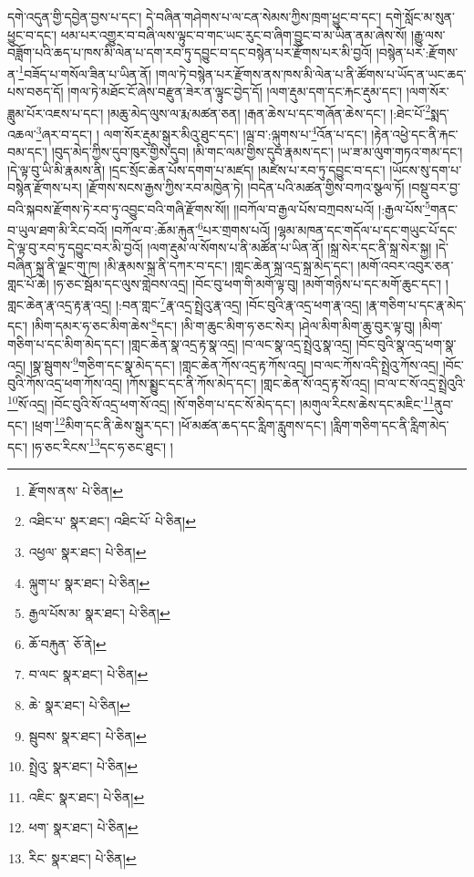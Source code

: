 དགེ་འདུན་གྱི་དབྱེན་བྱས་པ་དང་། དེ་བཞིན་གཤེགས་པ་ལ་ངན་སེམས་ཀྱིས་ཁྲག་ཕྱུང་བ་དང་། དགེ་སློང་མ་སུན་ཕྱུང་བ་དང་། ཕམ་པར་འགྱུར་བ་བཞི་ལས་ལྟུང་བ་གང་ཡང་རུང་བ་ཞིག་བྱུང་བ་མ་ཡིན་ནམ་ཞེས་སོ། །རྒྱུ་ལས་བཟློག་པའི་ཆད་པ་ཁས་མི་ལེན་པ་དག་རབ་ཏུ་དབྱུང་བ་དང་བསྙེན་པར་རྫོགས་པར་མི་བྱའོ། །བསྙེན་པར་:རྫོགས་ན་\footnote{རྫོགས་ནས་  པེ་ཅིན། }བཟོད་པ་གསོལ་ཟིན་པ་ཡིན་ནོ། །གལ་ཏེ་བསྙེན་པར་རྫོགས་ནས་ཁས་མི་ལེན་པ་ནི་ཚོགས་པ་ཡོད་ན་ཡང་ཆད་པས་བཅད་དོ། །གལ་ཏེ་མཐོང་ངོ་ཞེས་བརྫུན་ཟེར་ན་ལྟུང་བྱེད་དོ། །ལག་རྡུམ་དག་དང་རྐང་རྡུམ་དང་། །ལག་སོར་ཟླུམ་པོར་འཇས་པ་དང་། །མཆུ་མེད་ལུས་ལ་རྨ་མཚན་ཅན། །རྒན་ཆེས་པ་དང་གཞོན་ཆེས་དང་། །:ཐེང་པོ་\footnote{འཐིང་པ་  སྣར་ཐང་། འཐིང་པོ་  པེ་ཅིན། }སྨད་འཆལ་\footnote{འཕྱལ་  སྣར་ཐང་།  པེ་ཅིན། }ཞར་བ་དང་། །
ལག་སོར་རྡུམ་སྒུར་མིའུ་ཐུང་དང་། །ལྦ་བ་:ལྐུགས་པ་\footnote{ལྐུག་པ་  སྣར་ཐང་།  པེ་ཅིན། }འོན་པ་དང་། །རྟེན་འཕྱེ་དང་ནི་རྐང་བམ་དང་། །བུད་མེད་ཀྱིས་དུབ་ཁུར་གྱིས་དུབ། །མི་གང་ལམ་གྱིས་དུབ་རྣམས་དང་། །ཡ་ཟ་མ་ལུག་གཏའ་གམ་དང་། །དེ་ལྟ་བུ་ཡི་མི་རྣམས་ནི། །དྲང་སྲོང་ཆེན་པོས་དགག་པ་མཛད། །མཛེས་པ་རབ་ཏུ་དབྱུང་བ་དང་། །ཡོངས་སུ་དག་པ་བསྙེན་རྫོགས་པར། །རྫོགས་སངས་རྒྱས་ཀྱིས་རབ་མཁྱེན་ཏེ། །བདེན་པའི་མཚན་གྱིས་བཀའ་སྩལ་ཏོ། །བསྡུ་བར་བྱ་བའི་སྐབས་རྫོགས་ཏེ་རབ་ཏུ་འབྱུང་བའི་གཞི་རྫོགས་སོ།། །།བཀོལ་བ་རྒྱལ་པོས་བཀྲབས་པའོ། །:རྒྱལ་པོས་\footnote{རྒྱལ་པོས་མ་  སྣར་ཐང་།  པེ་ཅིན། }གནང་བ་ཡུལ་ཐག་མི་རིང་བའོ། །བཀོལ་བ་:ཆོམ་རྐུན་\footnote{ཆོ་བརྐུན་  ཅོ་ནེ། }པར་གྲགས་པའོ། །ལྷམ་མཁན་དང་གདོལ་པ་དང་གཡུང་པོ་དང་དེ་ལྟ་བུ་རབ་ཏུ་དབྱུང་བར་མི་བྱའོ། །ལག་རྡུམ་ལ་སོགས་པ་ནི་མཚོན་པ་ཡིན་ནོ། །སྐྲ་སེར་དང་ནི་སྐྲ་སེར་སྐྱ། །དེ་བཞིན་སྐྲ་ནི་ལྗང་གུ་ཁ། །མི་རྣམས་སྐྲ་ནི་དཀར་བ་དང་། །གླང་ཆེན་སྐྲ་འདྲ་སྐྲ་མེད་དང་། །མགོ་འབར་འབུར་ཅན་གླང་པོ་ཆེ། །ཧ་ཅང་སྦོམ་དང་ལུས་གླེབས་འདྲ། །བོང་བུ་ཕག་གི་མགོ་ལྟ་བུ། །མགོ་གཉིས་པ་དང་མགོ་ཆུང་དང་། །གླང་ཆེན་རྣ་འདྲ་རྟ་རྣ་འདྲ། །:བན་གླང་\footnote{བ་ལང་  སྣར་ཐང་།  པེ་ཅིན། }རྣ་འདྲ་སྤྲེའུ་རྣ་འདྲ། །བོང་བུའི་རྣ་འདྲ་ཕག་རྣ་འདྲ། །རྣ་གཅིག་པ་དང་རྣ་མེད་དང་། །མིག་དམར་ཧ་ཅང་མིག་ཆེས་\footnote{ཆེ་  སྣར་ཐང་།  པེ་ཅིན། }དང་། །མི་ག་ཆུང་མིག་ཧ་ཅང་སེར། །ཤེལ་མིག་མིག་ཆུ་བུར་ལྟ་བུ། །མིག་གཅིག་པ་དང་མིག་མེད་དང་། །གླང་ཆེན་སྣ་འདྲ་རྟ་སྣ་འདྲ། །བ་ལང་སྣ་འདྲ་སྤྲེའུ་སྣ་འདྲ། །བོང་བུའི་སྣ་འདྲ་ཕག་སྣ་འདྲ། །སྣ་སྦུགས་\footnote{སྦུབས་  སྣར་ཐང་།  པེ་ཅིན། }གཅིག་དང་སྣ་མེད་དང་། །གླང་ཆེན་ཀོས་འདྲ་རྟ་ཀོས་འདྲ། །བ་ལང་ཀོས་འདི་སྤྲེའུ་ཀོས་འདྲ། །བོང་བུའི་ཀོས་འདྲ་ཕག་ཀོས་འདྲ། །ཀོས་སྨྱུང་དང་ནི་ཀོས་མེད་དང་། །གླང་ཆེན་སོ་འདྲ་རྟ་སོ་འདྲ། །བ་ལ་ང་སོ་འདྲ་སྤྲེའུའི་\footnote{སྤྲེའུ་  སྣར་ཐང་།  པེ་ཅིན། }སོ་འདྲ། །བོང་བུའི་སོ་འདྲ་ཕག་སོ་འདྲ། །སོ་གཅིག་པ་དང་སོ་མེད་དང་། །མགུལ་རིངས་ཆེས་དང་མཇིང་\footnote{འཇིང་  སྣར་ཐང་།  པེ་ཅིན། }ནུབ་དང་། །ཕྲག་\footnote{ཕག་  སྣར་ཐང་།  པེ་ཅིན། }མིག་དང་ནི་ཆེས་སྒུར་དང་། །ཕོ་མཚན་ཆད་དང་རླིག་རླུགས་དང་། །རླིག་གཅིག་དང་ནི་རླིག་མེད་དང་། །ཧ་ཅང་རིངས་\footnote{རིང་  སྣར་ཐང་།  པེ་ཅིན། }དང་ཧ་ཅང་ཐུང་། །

